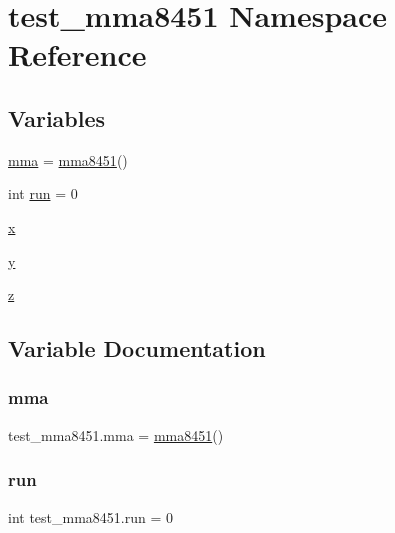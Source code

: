 \hypertarget{namespacetest__mma8451}{}\section{test\+\_\+mma8451 Namespace Reference}
\label{namespacetest__mma8451}
\subsection*{Variables}
\begin{DoxyCompactItemize}
\item 
\hyperlink{namespacetest__mma8451_a13fbd02347c49d7bd4bd8c38a313db4c}{mma} = \hyperlink{classmma8451_1_1mma8451}{mma8451}()
\item 
int \hyperlink{namespacetest__mma8451_abd2f9636e37f3a0fbfe1566911d36f6d}{run} = 0
\item 
\hyperlink{namespacetest__mma8451_ad3dd9dd1845c532d2d3dc00bae7ab91c}{x}
\item 
\hyperlink{namespacetest__mma8451_ad82b34214a57bd81562a904d9229769a}{y}
\item 
\hyperlink{namespacetest__mma8451_a419e69f5d82bcadf81f8b00335f88c28}{z}
\end{DoxyCompactItemize}


\subsection{Variable Documentation}
\mbox{\label{namespacetest__mma8451_a13fbd02347c49d7bd4bd8c38a313db4c}} 
\subsubsection{\texorpdfstring{mma}{mma}}
{\footnotesize\ttfamily test\+\_\+mma8451.\+mma = \hyperlink{classmma8451_1_1mma8451}{mma8451}()}

\mbox{\label{namespacetest__mma8451_abd2f9636e37f3a0fbfe1566911d36f6d}} 
\subsubsection{\texorpdfstring{run}{run}}
{\footnotesize\ttfamily int test\+\_\+mma8451.\+run = 0}

